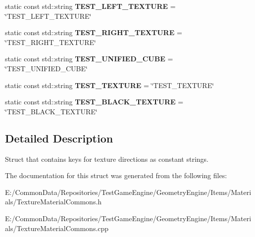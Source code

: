 \begin{DoxyCompactItemize}
\item 
\mbox{\label{struct_geometry_engine_1_1_geometry_material_1_1_texture_constant_a14d17c2dd6125effc0109ac404df9741}} 
static const std\+::string {\bfseries T\+E\+S\+T\+\_\+\+L\+E\+F\+T\+\_\+\+T\+E\+X\+T\+U\+RE} = \char`\"{}T\+E\+S\+T\+\_\+\+L\+E\+F\+T\+\_\+\+T\+E\+X\+T\+U\+RE\char`\"{}
\item 
\mbox{\label{struct_geometry_engine_1_1_geometry_material_1_1_texture_constant_ac18fed20edf867ce13ccd3cb3cde43cd}} 
static const std\+::string {\bfseries T\+E\+S\+T\+\_\+\+R\+I\+G\+H\+T\+\_\+\+T\+E\+X\+T\+U\+RE} = \char`\"{}T\+E\+S\+T\+\_\+\+R\+I\+G\+H\+T\+\_\+\+T\+E\+X\+T\+U\+RE\char`\"{}
\item 
\mbox{\label{struct_geometry_engine_1_1_geometry_material_1_1_texture_constant_a133496f744e5c15fb2b2bed24b348f2d}} 
static const std\+::string {\bfseries T\+E\+S\+T\+\_\+\+U\+N\+I\+F\+I\+E\+D\+\_\+\+C\+U\+BE} = \char`\"{}T\+E\+S\+T\+\_\+\+U\+N\+I\+F\+I\+E\+D\+\_\+\+C\+U\+BE\char`\"{}
\item 
\mbox{\label{struct_geometry_engine_1_1_geometry_material_1_1_texture_constant_ac96667257b17fce30cf2a27785483bd7}} 
static const std\+::string {\bfseries T\+E\+S\+T\+\_\+\+T\+E\+X\+T\+U\+RE} = \char`\"{}T\+E\+S\+T\+\_\+\+T\+E\+X\+T\+U\+RE\char`\"{}
\item 
\mbox{\label{struct_geometry_engine_1_1_geometry_material_1_1_texture_constant_ac0676c7dcdd7639f65e6bd1cb2b67772}} 
static const std\+::string {\bfseries T\+E\+S\+T\+\_\+\+B\+L\+A\+C\+K\+\_\+\+T\+E\+X\+T\+U\+RE} = \char`\"{}T\+E\+S\+T\+\_\+\+B\+L\+A\+C\+K\+\_\+\+T\+E\+X\+T\+U\+RE\char`\"{}
\end{DoxyCompactItemize}


\subsection{Detailed Description}
Struct that contains keys for texture directions as constant strings. 

The documentation for this struct was generated from the following files\+:\begin{DoxyCompactItemize}
\item 
E\+:/\+Common\+Data/\+Repositories/\+Test\+Game\+Engine/\+Geometry\+Engine/\+Items/\+Materials/Texture\+Material\+Commons.\+h\item 
E\+:/\+Common\+Data/\+Repositories/\+Test\+Game\+Engine/\+Geometry\+Engine/\+Items/\+Materials/Texture\+Material\+Commons.\+cpp\end{DoxyCompactItemize}
